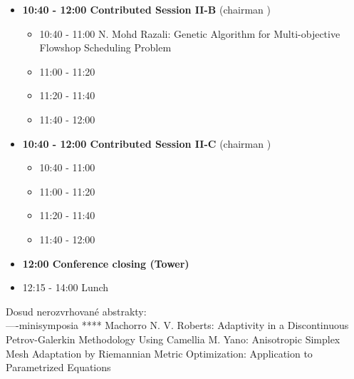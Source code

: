 \documentclass[10pt, A4]{article}%
\begin{document}
\begin{itemize}
  \item {\bf 10:40 - 12:00 Contributed Session II-B} (chairman ) 
  \begin{itemize}
    \item 10:40 - 11:00 {N. Mohd Razali}: {Genetic Algorithm for Multi-objective Flowshop Scheduling Problem}
    \item 11:00 - 11:20 
    \item 11:20 - 11:40 
    \item 11:40 - 12:00  
  \end{itemize}
  \item {\bf 10:40 - 12:00 Contributed Session II-C} (chairman ) 
  \begin{itemize}
    \item 10:40 - 11:00 
    \item 11:00 - 11:20 
    \item 11:20 - 11:40 
    \item 11:40 - 12:00 
  \end{itemize}
  \item {\bf 12:00 Conference closing (Tower)}
  \item 12:15 - 14:00 Lunch
\newpage
\end{itemize}




\newpage
Dosud nerozvrhované abstrakty:\\
----minisymposia 
**** Machorro
{N. V. Roberts}: {Adaptivity in a Discontinuous Petrov-Galerkin Methodology Using Camellia}
{M. Yano}: {Anisotropic Simplex Mesh Adaptation by Riemannian Metric Optimization: Application to Parametrized Equations}
\end{document}
